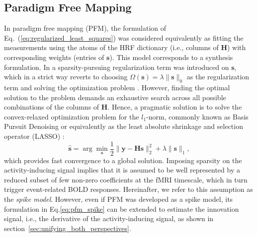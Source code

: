 \subsection{Paradigm Free Mapping}
 In paradigm free mapping (PFM), the formulation of
 Eq.~(\ref{eq:regularized_least_squares}) was considered equivalently as fitting
 the measurements using the atoms of the HRF dictionary (i.e., columns of
 $\mathbf{H}$) with corresponding weights (entries of $\mathbf{s}$). This model
 corresponds to a synthesis formulation. In
 \citealt{Gaudes2013Paradigmfreemapping} a sparsity-pursuing regularization term
 was introduced on $\mathbf{s}$, which in a strict way reverts to choosing
 \(\Omega(\mathbf{s})=\lambda \| \mathbf{s} \|_0\) as the regularization term
 and solving the optimization problem
 \citep{Bruckstein2009SparseSolutionsSystems}. However, finding the optimal
 solution to the problem demands an exhaustive search across all possible
 combinations of the columns of \(\mathbf{H}\). Hence, a  pragmatic solution is
 to solve the convex-relaxed optimization problem for the \(l_1\)-norm, commonly
 known as Basis Pursuit Denoising \citep{Chen2001BasisPursuitDenoising} or
 equivalently as the least absolute shrinkage and selection operator (LASSO)
 \citep{Tibshirani1996RegressionShrinkageSelection}: 
\begin{equation}
    \label{eq:pfm_spike}
    \hat{\mathbf{s}} = \arg \min_{\mathbf{s}} \frac{1}{2} \| \mathbf{y} - \mathbf{Hs} \|_2^2 + \lambda \| \mathbf{s} \|_1,
\end{equation}
which provides fast convergence to a global solution. Imposing sparsity on the
activity-inducing signal implies that it is assumed to be well represented by a
reduced subset of few non-zero coefficients at the fMRI timescale, which in turn
trigger event-related BOLD responses. Hereinafter, we refer to this assumption
as the \textit{spike model}. However, even if PFM was developed
as a spike model, its formulation in Eq.\eqref{eq:pfm_spike} can be extended to
estimate the innovation signal, i.e., the derivative of the activity-inducing
signal, as shown in section~\ref{sec:unifying_both_perspectives}.



